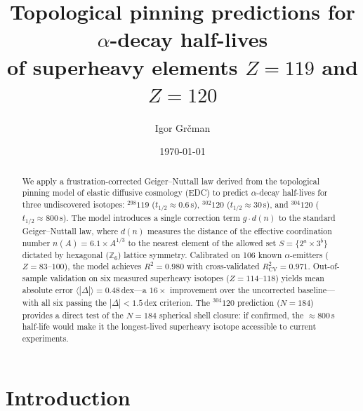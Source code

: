 \documentclass[aps,prc,twocolumn,showpacs,preprintnumbers,amsmath,amssymb]{revtex4-2}
\newcommand{\thalf}{t_{1/2}}
\newcommand{\dn}{d(n)}
\begin{document}

\title{Topological pinning predictions for $\alpha$-decay half-lives\\
of superheavy elements $Z=119$ and $Z=120$}

\author{Igor Gr\v{c}man}

\date{\today}

\begin{abstract}
We apply a frustration-corrected Geiger--Nuttall law derived from
the topological pinning model of elastic diffusive cosmology (EDC)
to predict $\alpha$-decay half-lives for three undiscovered isotopes:
${}^{298}119$ ($\thalf \approx 0.6$\,s),
${}^{302}120$ ($\thalf \approx 30$\,s), and
${}^{304}120$ ($\thalf \approx 800$\,s).
The model introduces a single correction term $g \cdot \dn$ to the
standard Geiger--Nuttall law, where $\dn$ measures the distance of
the effective coordination number $n(A) = 6.1 \times A^{1/3}$ to
the nearest element of the allowed set
$S = \{2^a \times 3^b\}$ dictated by hexagonal ($\mathbb{Z}_6$)
lattice symmetry.
Calibrated on 106 known $\alpha$-emitters ($Z = 83$--$100$), the
model achieves $R^2 = 0.980$ with cross-validated $R^2_{\mathrm{CV}}
= 0.971$.  Out-of-sample validation on six measured superheavy
isotopes ($Z = 114$--$118$) yields mean absolute error
$\langle|\Delta|\rangle = 0.48$\,dex---a $16\times$ improvement over
the uncorrected baseline---with all six passing the
$|\Delta| < 1.5$\,dex criterion.
The ${}^{304}120$ prediction ($N = 184$) provides a direct test of
the $N = 184$ spherical shell closure: if confirmed, the
$\approx 800$\,s half-life would make it the longest-lived
superheavy isotope accessible to current experiments.
\end{abstract}


\maketitle

\section{Introduction}
\label{sec:intro}
\end{document}
